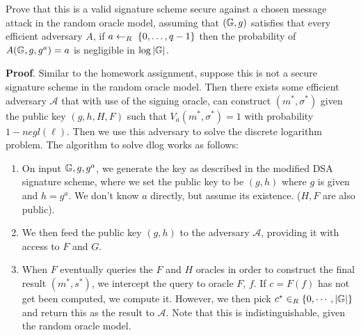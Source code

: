 \documentclass{article}
\begin{document}
Prove that this is a valid signature scheme secure against a chosen message attack in the random oracle model, assuming that  $(\mathbb{G},g)$ satisfies that every efficient adversary $A$, if $a \leftarrow_R\; \{0,\ldots, q-1\}$ then the probability of $A(\mathbb{G},g,g^a)=a$ is negligible in $\log |\mathbb{G}|$.%

\begin{mdbmarginx}{1ex}{0pt}{1ex}{0pt}%
\noindent{}\textbf{Proof}.    Similar to the homework assignment, suppose this is not a secure signature scheme in the random oracle model.
  Then there exists some efficient adversary $\mathcal{A}$ that with use of the signing oracle,
  can construct $(m^*, \sigma^*)$ given the public key $(g,h,H,F)$ such that $V_a(m^*,\sigma^*) = 1$ with
  probability $1 - negl(\ell)$. Then we use this adversary to solve the discrete logarithm problem. 
  The algorithm to solve dlog works as follows:%

\begin{enumerate}[noitemsep,topsep=\mdcompacttopsep]%

\item{}On input $\mathbb{G}, g, g^a$, we generate the key as described in the modified DSA signature scheme, where
we set the public key to be $(g,h)$ where $g$ is given and $h = g^a$. We don't know $a$ directly,
but assume its existence. ($H,F$ are also public).%

\item{}We then feed the public key $(g,h)$ to the adversary $\mathcal{A}$, providing it with access 
to $F$ and $G$.%

\item{}When $F$ eventually queries the $F$ and $H$ oracles in order to construct the final result
$(m^*, s^*)$, we intercept the query to oracle $F$, $f$. If $c = F(f)$ has not get been computed,
we compute it. However, we then pick $c^* \in_R \{0, \cdots, |\mathbb{G}|\}$ and return this as the
result to $\mathcal{A}$. Note that this is indistinguishable, given the random oracle model.%


\end{enumerate}
\end{mdbmarginx}
\end{document}

